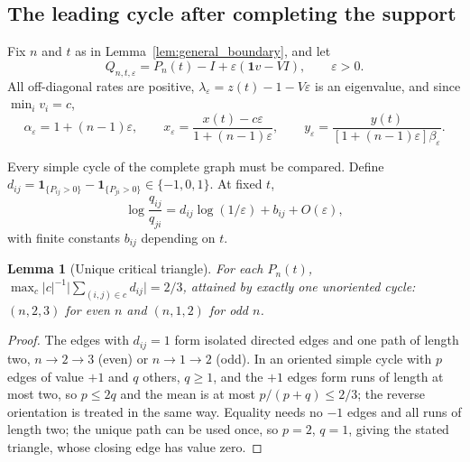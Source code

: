 \documentclass[11pt,a4paper]{article}
\numberwithin{equation}{section}
\newtheorem{lemma}[theorem]{Lemma}
\theoremstyle{definition}
\theoremstyle{remark}
\newcommand{\one}{\mathbf{1}}
\newcommand{\eps}{\varepsilon}
\begin{document}
\subsection{The leading cycle after completing the support}

Fix \(n\) and \(t\) as in Lemma~\ref{lem:general_boundary}, and let
\begin{equation}
Q_{n,t,\eps}=P_n(t)-I+\eps(\one v-VI),\qquad \eps>0.
\label{eq:general_reset}
\end{equation}
All off-diagonal rates are positive, \(\lambda_\eps=z(t)-1-V\eps\) is an
eigenvalue, and since \(\min_iv_i=c\),
\begin{equation}
\alpha_\eps=1+(n-1)\eps,\qquad
x_\eps=\frac{x(t)-c\eps}{1+(n-1)\eps},\qquad
y_\eps=\frac{y(t)}{[1+(n-1)\eps]\beta_\eps}.
\label{eq:general_coordinates}
\end{equation}

Every simple cycle of the complete graph must be compared. Define
\(d_{ij}=\mathbf 1_{\{P_{ij}>0\}}-\mathbf 1_{\{P_{ji}>0\}}\in\{-1,0,1\}\).
At fixed \(t\),
\begin{equation}
\log\frac{q_{ij}}{q_{ji}}=d_{ij}\log(1/\eps)+b_{ij}+O(\eps),
\label{eq:edge_valuation}
\end{equation}
with finite constants \(b_{ij}\) depending on \(t\).

\begin{lemma}[Unique critical triangle]
\label{lem:critical_triangle}
For each \(P_n(t)\),
\(\max_c|c|^{-1}\bigl|\sum_{(i,j)\in c}d_{ij}\bigr|=2/3\), attained by
exactly one unoriented cycle: \((n,2,3)\) for even \(n\) and
\((n,1,2)\) for odd \(n\).
\end{lemma}

\begin{proof}
The edges with \(d_{ij}=1\) form isolated directed edges and one path
of length two, \(n\to2\to3\) (even) or \(n\to1\to2\) (odd). In an
oriented simple cycle with \(p\) edges of value \(+1\) and \(q\) others,
\(q\ge1\), and the \(+1\) edges form runs of length at most two, so
\(p\le2q\) and the mean is at most \(p/(p+q)\le2/3\); the reverse
orientation is treated in the same way. Equality needs no \(-1\) edges
and all runs of length two; the unique path can be used once, so
\(p=2\), \(q=1\), giving the stated triangle, whose closing edge has
value zero.
\end{proof}
\end{document}
